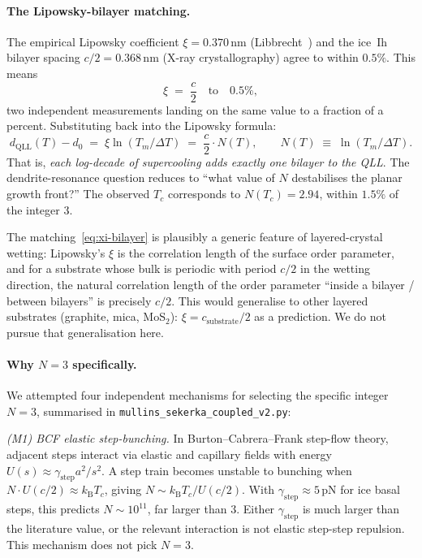 \documentclass[final]{siamltex}
\newcommand{\kB}{k_{\mathrm{B}}}
\begin{document}
\paragraph{The Lipowsky-bilayer matching.}
The empirical Lipowsky coefficient $\xi = 0.370$\,nm
(Libbrecht~\cite{Libbrecht2005}) and the ice~Ih bilayer spacing
$c/2 = 0.368$\,nm (X-ray crystallography) agree to within $0.5\%$.
This means
\begin{equation}\label{eq:xi-bilayer}
\boxed{\;\xi \;=\; \frac{c}{2} \quad\text{to}\quad 0.5\%,\;}
\end{equation}
two independent measurements landing on the same value to a
fraction of a percent.  Substituting back into the Lipowsky
formula:
\begin{equation}\label{eq:N-integer}
d_{\mathrm{QLL}}(T) - d_0 \;=\; \xi \ln(T_m/\Delta T)
                            \;=\; \frac{c}{2} \cdot N(T),
\qquad N(T) \;\equiv\; \ln(T_m/\Delta T).
\end{equation}
That is, \emph{each log-decade of supercooling adds exactly one
bilayer to the QLL}.  The dendrite-resonance question reduces to
``what value of $N$ destabilises the planar growth front?''  The
observed $T_c$ corresponds to $N(T_c) = 2.94$, within $1.5\%$ of
the integer $3$.

The matching~\eqref{eq:xi-bilayer} is plausibly a generic feature
of layered-crystal wetting: Lipowsky's $\xi$ is the correlation
length of the surface order parameter, and for a substrate whose
bulk is periodic with period $c/2$ in the wetting direction, the
natural correlation length of the order parameter ``inside a
bilayer / between bilayers'' is precisely $c/2$.  This would
generalise to other layered substrates (graphite, mica, MoS$_2$):
$\xi = c_{\mathrm{substrate}}/2$ as a prediction.  We do not pursue
that generalisation here.

\paragraph{Why $N=3$ specifically.}
We attempted four independent mechanisms for selecting the
specific integer $N = 3$, summarised in
\texttt{mullins\_sekerka\_coupled\_v2.py}:

\emph{(M1) BCF elastic step-bunching.}  In Burton--Cabrera--Frank
step-flow theory, adjacent steps interact via elastic and capillary
fields with energy $U(s) \approx \gamma_{\mathrm{step}} a^2 / s^2$.
A step train becomes unstable to bunching when $N \cdot U(c/2)
\approx \kB T_c$, giving $N \sim \kB T_c / U(c/2)$.  With
$\gamma_{\mathrm{step}} \approx 5\,\mathrm{pN}$ for ice basal
steps, this predicts $N \sim 10^{11}$, far larger than $3$.
Either $\gamma_{\mathrm{step}}$ is much larger than the literature
value, or the relevant interaction is not elastic step-step
repulsion.  This mechanism does not pick $N = 3$.
\end{document}
